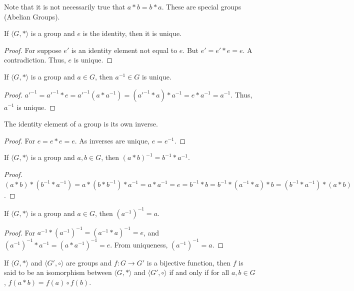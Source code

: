 \documentclass[crop=false,class=book,oneside]{standalone}
\begin{document}
        \begin{remark}
        Note that it is not necessarily true that $a*b = b*a$. These are special groups (Abelian Groups).
        \end{remark}
        \begin{theorem}
        If $\langle G, * \rangle$ is a group and $e$ is the identity, then it is unique.
        \end{theorem}
        \begin{proof}
        For suppose $e'$ is an identity element not equal to $e$. But $e' = e'*e  = e$. A contradiction. Thus, $e$ is unique.
        \end{proof}
        \begin{theorem}
        If $\langle G, * \rangle$ is a group and $a\in G$, then $a^{-1}\in G$ is unique.
        \end{theorem}
        \begin{proof}
        $a'^{-1} = a'^{-1}*e = a'^{-1}(a*a^{-1}) = (a'^{-1}*a)*a^{-1} = e*a^{-1} = a^{-1}$. Thus, $a^{-1}$ is unique.
        \end{proof}
        \begin{corollary}
        The identity element of a group is its own inverse.
        \end{corollary}
        \begin{proof}
        For $e=e*e = e$. As inverses are unique, $e=e^{-1}$.
        \end{proof}
        \begin{theorem}
        If $\langle G,*\rangle$ is a group and $a,b\in G$, then $(a*b)^{-1} = b^{-1}*a^{-1}$.
        \end{theorem}
        \begin{proof}
        $(a*b)*(b^{-1}*a^{-1}) = a*(b*b^{-1})*a^{-1} = a*a^{-1} = e=b^{-1}*b=b^{-1}*(a^{-1}*a)*b=(b^{-1}*a^{-1})*(a*b)  $.
        \end{proof}
        \begin{theorem}
        If $\langle G,* \rangle$ is a group and $a\in G$, then $(a^{-1})^{-1} = a$.
        \end{theorem}
        \begin{proof}
        For $a^{-1}*(a^{-1})^{-1} = (a^{-1}* a)^{-1} = e$, and $(a^{-1})^{-1}*a^{-1} = (a*a^{-1})^{-1} = e$. From uniqueness, $(a^{-1})^{-1} = a$.
        \end{proof}
        \begin{definition}
        If $\langle G, * \rangle$ and $\langle G',\circ \rangle$ are groups and $f:G\rightarrow G'$ is a bijective function, then $f$ is said to be an isomorphism between $\langle G, * \rangle$ and $\langle G',\circ \rangle$ if and only if for all $a,b\in G$, $f(a*b) =f(a)\circ f(b)$.
        \end{definition}
\end{document}
